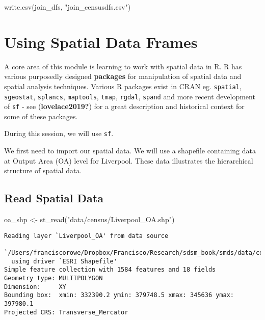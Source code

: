 \documentclass[
  letterpaper,
  krantz2]{style/krantz}
\newenvironment{Shaded}{\begin{snugshade}}{\end{snugshade}}
\newcommand{\FunctionTok}[1]{\textcolor[rgb]{0.28,0.35,0.67}{#1}}
\newcommand{\NormalTok}[1]{\textcolor[rgb]{0.00,0.23,0.31}{#1}}
\newcommand{\OtherTok}[1]{\textcolor[rgb]{0.00,0.23,0.31}{#1}}
\newcommand{\StringTok}[1]{\textcolor[rgb]{0.13,0.47,0.30}{#1}}
\begin{document}
\begin{Shaded}
\begin{Highlighting}[]
\FunctionTok{write.csv}\NormalTok{(join\_dfs, }\StringTok{"join\_censusdfs.csv"}\NormalTok{)}
\end{Highlighting}
\end{Shaded}

\hypertarget{using-spatial-data-frames}{%
\section{Using Spatial Data Frames}\label{using-spatial-data-frames}}

A core area of this module is learning to work with spatial data in R. R
has various purposedly designed \textbf{packages} for manipulation of
spatial data and spatial analysis techniques. Various R packages exist
in CRAN eg. \texttt{spatial}, \texttt{sgeostat}, \texttt{splancs},
\texttt{maptools}, \texttt{tmap}, \texttt{rgdal}, \texttt{spand} and
more recent development of \texttt{sf} - see (\textbf{lovelace2019?})
for a great description and historical context for some of these
packages.

During this session, we will use \texttt{sf}.

We first need to import our spatial data. We will use a shapefile
containing data at Output Area (OA) level for Liverpool. These data
illustrates the hierarchical structure of spatial data.

\hypertarget{read-spatial-data}{%
\subsection{Read Spatial Data}\label{read-spatial-data}}

\begin{Shaded}
\begin{Highlighting}[]
\NormalTok{oa\_shp }\OtherTok{\textless{}{-}} \FunctionTok{st\_read}\NormalTok{(}\StringTok{"data/census/Liverpool\_OA.shp"}\NormalTok{)}
\end{Highlighting}
\end{Shaded}

\begin{verbatim}
Reading layer `Liverpool_OA' from data source 
  `/Users/franciscorowe/Dropbox/Francisco/Research/sdsm_book/smds/data/census/Liverpool_OA.shp' 
  using driver `ESRI Shapefile'
Simple feature collection with 1584 features and 18 fields
Geometry type: MULTIPOLYGON
Dimension:     XY
Bounding box:  xmin: 332390.2 ymin: 379748.5 xmax: 345636 ymax: 397980.1
Projected CRS: Transverse_Mercator
\end{verbatim}
\end{document}
